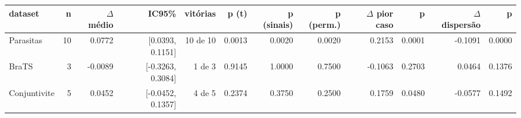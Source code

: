 \begin{adjustbox}{max width=\linewidth}
\begin{tabular}{lrrrrrrrrrrr}
\toprule
dataset & n & $\Delta$ médio & IC95\% & vitórias & p (t) & p (sinais) & p (perm.) & $\Delta$ pior caso & p  & $\Delta$ dispersão & p   \\
\midrule
Parasitas & 10 & 0.0772 & [0.0393, 0.1151] & 10 de 10 & 0.0013 & 0.0020 & 0.0020 & 0.2153 & 0.0001 & -0.1091 & 0.0000 \\
BraTS & 3 & -0.0089 & [-0.3263, 0.3084] & 1 de 3 & 0.9145 & 1.0000 & 0.7500 & -0.1063 & 0.2703 & 0.0464 & 0.1376 \\
Conjuntivite & 5 & 0.0452 & [-0.0452, 0.1357] & 4 de 5 & 0.2374 & 0.3750 & 0.2500 & 0.1759 & 0.0480 & -0.0577 & 0.1492 \\
\bottomrule
\end{tabular}
\end{adjustbox}
